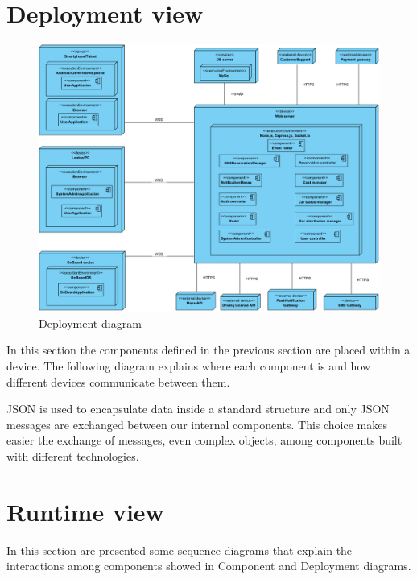 \section{Deployment view}
\begin{figure}[H]
\includegraphics[width=\textwidth, keepaspectratio]{../images/architectural_design/deployment_diagram.png}
\caption{Deployment diagram}
\end{figure}
In this section the components defined in the previous section are placed within a device.
The following diagram explains where each component is and how  different devices communicate between them.

JSON is used to encapsulate data inside a standard structure and only JSON messages are exchanged between our internal components.
This choice makes easier the exchange of messages, even complex objects, among components built with different technologies.

\section{Runtime view}
In this section are presented some sequence diagrams that explain the interactions among components showed in Component and Deployment diagrams.

